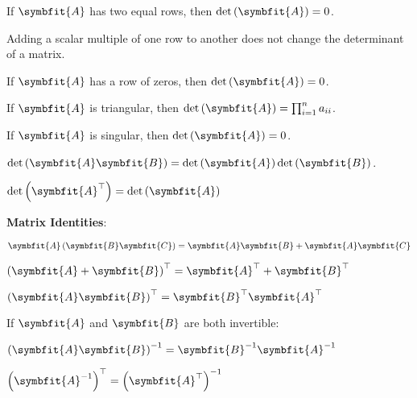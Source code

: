 \documentclass{article}
\begin{document}
\noindent If $\symbfit{A}$ has two equal rows, then $\det{\left( \symbfit{A} \right)}=0$. 

\noindent Adding a scalar multiple of one row to another does not change the determinant of a matrix. 

\noindent If $\symbfit{A}$ has a row of zeros, then $\det{\left( \symbfit{A} \right)}=0$. 

\noindent If $\symbfit{A}$ is triangular, then $\det{\left( \symbfit{A} \right)}=\prod_{i=1}^{n} a_{ii}$. 

\noindent If $\symbfit{A}$ is singular, then $\det{\left( \symbfit{A} \right)}=0$. 

\noindent$\det{\left( \symbfit{A}\symbfit{B} \right)}=\det{\left( \symbfit{A} \right)}\det{\left( \symbfit{B} \right)}$. 

\noindent$\det{\left( \symbfit{A}^\top \right)}=\det{\left( \symbfit{A} \right)}$ 

\noindent\textbf{Matrix Identities}:

\noindent$\symbfit{A}\left( \symbfit{B}\symbfit{C} \right) = \symbfit{A}\symbfit{B}+\symbfit{A}\symbfit{C}$

\noindent$\left( \symbfit{A}+\symbfit{B} \right)^\top = \symbfit{A}^\top + \symbfit{B}^\top$

\noindent$\left( \symbfit{A}\symbfit{B} \right)^\top = \symbfit{B}^\top \symbfit{A}^\top$

\noindent If $\symbfit{A}$ and $\symbfit{B}$ are both invertible:

\noindent$\left( \symbfit{A}\symbfit{B} \right)^{-1} = \symbfit{B}^{-1}\symbfit{A}^{-1}$

\noindent$\left( \symbfit{A}^{-1} \right)^\top = \left( \symbfit{A}^\top \right)^{-1}$

\thispagestyle{empty}
\end{document}
